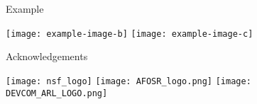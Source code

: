 \documentclass[final]{beamer}
\newlength{\sepwid}
\newlength{\onecolwid}
\begin{document}
\begin{frame}[t]
\begin{columns}[t]
\begin{column}{\onecolwid}
\end{column} %
\hspace{\sepwid}
\begin{column}{\onecolwid} %
    
    \begin{block}{Example}
        \lipsum[3][1-2]
        \begin{center}
            \texttt{[image: example-image-b]}
            \texttt{[image: example-image-c]}
            \vfill
        \end{center}
    \end{block}

    \begin{block}{Acknowledgements}
        \begin{center}
            \begin{minipage}{0.9\linewidth}
                \hfill
                \texttt{[image: nsf\_logo]}
                \hfill
                \texttt{[image: AFOSR\_logo.png]}
                \hfill
                \texttt{[image: DEVCOM\_ARL\_LOGO.png]}
                \hfill
            \end{minipage}
        \end{center}
    \end{block}
\end{column}
\end{columns} %

\end{frame} %
\end{document}
